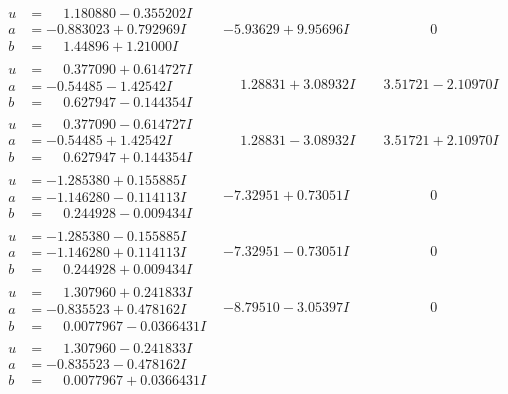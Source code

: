 \documentclass[1p]{elsarticle_modified}
\theoremstyle{definition}
\begin{document}
$$\begin{array}{c|c|c}
\begin{aligned}
u &= \phantom{-}1.180880 - 0.355202 I \\
a &= -0.883023 + 0.792969 I \\
b &= \phantom{-}1.44896 + 1.21000 I\end{aligned}
 & -5.93629 + 9.95696 I & \phantom{-0.000000 } 0 \\ \hline\begin{aligned}
u &= \phantom{-}0.377090 + 0.614727 I \\
a &= -0.54485 - 1.42542 I \\
b &= \phantom{-}0.627947 - 0.144354 I\end{aligned}
 & \phantom{-}1.28831 + 3.08932 I & \phantom{-}3.51721 - 2.10970 I \\ \hline\begin{aligned}
u &= \phantom{-}0.377090 - 0.614727 I \\
a &= -0.54485 + 1.42542 I \\
b &= \phantom{-}0.627947 + 0.144354 I\end{aligned}
 & \phantom{-}1.28831 - 3.08932 I & \phantom{-}3.51721 + 2.10970 I \\ \hline\begin{aligned}
u &= -1.285380 + 0.155885 I \\
a &= -1.146280 - 0.114113 I \\
b &= \phantom{-}0.244928 - 0.009434 I\end{aligned}
 & -7.32951 + 0.73051 I & \phantom{-0.000000 } 0 \\ \hline\begin{aligned}
u &= -1.285380 - 0.155885 I \\
a &= -1.146280 + 0.114113 I \\
b &= \phantom{-}0.244928 + 0.009434 I\end{aligned}
 & -7.32951 - 0.73051 I & \phantom{-0.000000 } 0 \\ \hline\begin{aligned}
u &= \phantom{-}1.307960 + 0.241833 I \\
a &= -0.835523 + 0.478162 I \\
b &= \phantom{-}0.0077967 - 0.0366431 I\end{aligned}
 & -8.79510 - 3.05397 I & \phantom{-0.000000 } 0 \\ \hline\begin{aligned}
u &= \phantom{-}1.307960 - 0.241833 I \\
a &= -0.835523 - 0.478162 I \\
b &= \phantom{-}0.0077967 + 0.0366431 I\end{aligned}

\end{array}$$
\end{document}
